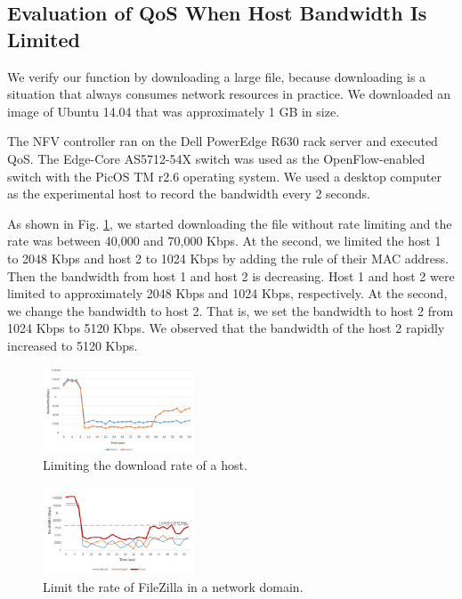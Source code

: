 \documentclass[conference]{IEEEtran}
\begin{document}
\subsection{Evaluation of QoS When Host Bandwidth Is Limited}

We verify our function by downloading a large file, because downloading is a situation that always consumes network resources in practice.
We downloaded an image of Ubuntu 14.04 that was approximately 1 GB in size.

The NFV controller ran on the Dell PowerEdge R630 rack server and executed QoS.
The Edge-Core AS5712-54X \cite{edge-core-switch} switch was used as the OpenFlow-enabled switch with the PicOS TM r2.6 operating system.
We used a desktop computer as the experimental host to record the bandwidth every 2 seconds.

As shown in Fig. \ref{fig:qos_limit_host}, we started downloading the file without rate limiting and the rate was between 40,000 and 70,000 Kbps.
At the  second, we limited the host 1 to 2048 Kbps and host 2 to 1024 Kbps by adding the rule of their MAC address.
Then the bandwidth from host 1 and host 2 is decreasing. Host 1 and host 2 were limited to approximately 2048 Kbps and 1024 Kbps, respectively.
At the  second, we change the bandwidth to host 2. That is, we set the bandwidth to host 2 from 1024 Kbps to 5120 Kbps.
We observed that the bandwidth of the host 2 rapidly increased to 5120 Kbps.

\begin{figure}[!t]
\centering
\includegraphics[width=0.4\textwidth]{./figures/qos_limit_host}
\caption{Limiting the download rate of a host.}
\label{fig:qos_limit_host}
\end{figure}

\begin{figure}[!t]
\centering
\includegraphics[width=0.4\textwidth]{./figures/mft_qos_rate_domain_app}
\caption{Limit the rate of FileZilla in a network domain.}
\label{fig:mft_qos_rate_domain_app}
\end{figure}
\end{document}
